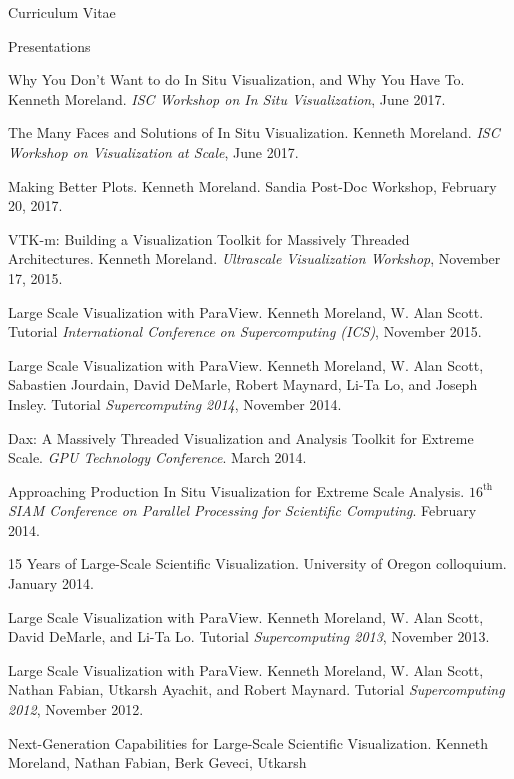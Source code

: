 \documentclass{article}
\begin{document}
\begin{cv}{Curriculum Vitae}
    \begin{cvlist}{Presentations}
    \item[Why You Don't Want to do In Situ Visualization, and Why You Have To.]
      Kenneth Moreland.
      \emph{ISC Workshop on In Situ Visualization}, June 2017.
    \item[The Many Faces and Solutions of In Situ Visualization.]
      Kenneth Moreland.
      \emph{ISC Workshop on Visualization at Scale}, June 2017.
    \item[Making Better Plots.]
      Kenneth Moreland.
      Sandia Post-Doc Workshop, February 20, 2017.
    \item[VTK-m: Building a Visualization Toolkit for Massively Threaded]~\\ Architectures.
      Kenneth Moreland.
      \emph{Ultrascale Visualization Workshop}, November 17, 2015.
    \item[Large Scale Visualization with ParaView.] Kenneth Moreland, W.
      Alan Scott. Tutorial \emph{International Conference on Supercomputing
        (ICS)}, November 2015.
    \item[Large Scale Visualization with ParaView.] Kenneth Moreland, W.
      Alan Scott, Sabastien Jourdain, David DeMarle, Robert Maynard, Li-Ta
      Lo, and Joseph Insley. Tutorial \emph{Supercomputing 2014}, November
      2014.
    \item[Dax: A Massively Threaded Visualization and Analysis Toolkit for
      Extreme] Scale. \emph{GPU Technology Conference}. March 2014.
    \item[Approaching Production In Situ Visualization for Extreme Scale
      Analysis.] \emph{$16^{\mathrm{th}}$ SIAM Conference on Parallel
      Processing for Scientific Computing}. February 2014.
    \item[15 Years of Large-Scale Scientific Visualization.] University of
      Oregon colloquium. January 2014.
    \item[Large Scale Visualization with ParaView.] Kenneth Moreland, W.
      Alan Scott, David DeMarle, and Li-Ta Lo. Tutorial
      \emph{Supercomputing 2013}, November 2013.
    \item[Large Scale Visualization with ParaView.] Kenneth Moreland,
      W. Alan Scott, Nathan Fabian, Utkarsh Ayachit, and Robert
      Maynard. Tutorial \emph{Supercomputing 2012}, November 2012.
    \item[Next-Generation Capabilities for Large-Scale Scientific
      Visualization.] Kenneth Moreland, Nathan Fabian, Berk Geveci, Utkarsh

\end{cvlist}
\end{cv}
\end{document}
